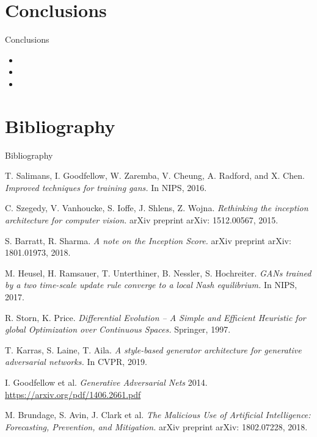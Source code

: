 \documentclass[t]{beamer}
\begin{document}
\section{Conclusions}

\begin{frame}[c]{Conclusions}
\begin{itemize}
\item  
\item 
\item 
\end{itemize}
\end{frame}

\section{Bibliography}

\begin{frame}{Bibliography}
\fontsize{2}{7.2}\selectfont
\begin{thebibliography}{a,b,c}
 T. Salimans, I. Goodfellow, W. Zaremba, V. Cheung, A. Radford, and X. Chen. {\it Improved techniques for training gans.} In NIPS, 2016.

 C. Szegedy, V. Vanhoucke, S. Ioffe, J. Shlens, Z. Wojna. {\it Rethinking the inception architecture for computer vision.} arXiv preprint arXiv: 1512.00567, 2015.

 S. Barratt, R. Sharma. {\it A note on the Inception Score.} arXiv preprint arXiv: 1801.01973, 2018.

 M. Heusel, H. Ramsauer, T. Unterthiner, B. Nessler, S. Hochreiter. {\it GANs trained by a two time-scale update rule converge to a local Nash equilibrium.} In NIPS, 2017.

 R. Storn, K. Price. {\it Differential Evolution – A Simple and Efficient Heuristic for global Optimization over Continuous Spaces.} Springer, 1997.

 T. Karras, S. Laine, T. Aila. {\it A style-based generator architecture for generative adversarial networks.} In CVPR, 2019.

 I. Goodfellow et al.  {\it Generative Adversarial Nets} 2014.  \url{https://arxiv.org/pdf/1406.2661.pdf}

 M. Brundage, S. Avin, J. Clark et al. {\it The Malicious Use of Artificial Intelligence: Forecasting, Prevention, and Mitigation.} arXiv preprint arXiv: 1802.07228, 2018.


\end{thebibliography}
\end{frame}
\end{document}
